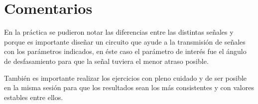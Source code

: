 \documentclass{article}
\begin{document}
\section{Comentarios}


En la práctica se pudieron notar las diferencias entre las distintas señales y porque es importante diseñar un circuito que ayude a la transmisión de señales con los parámetros indicados, en éste caso el parámetro de interés fue el ángulo de desfasamiento para que la señal tuviera el menor atraso posible.

También es importante realizar los ejercicios con pleno cuidado y de ser posible en la misma sesión para que los resultados sean los más consistentes y con valores estables entre ellos.



\end{document}
